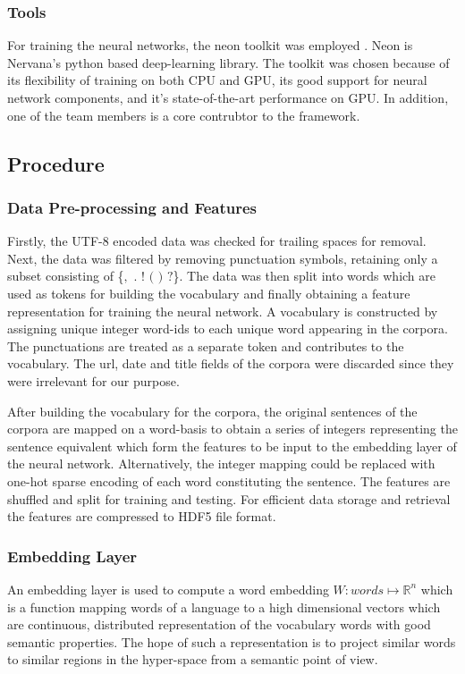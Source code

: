 \documentclass[12pt]{article}
\begin{document}
\subsubsection{Tools}
For training the neural networks, the neon toolkit was employed \cite{Neon}. Neon is Nervana's python based deep-learning library. The toolkit was chosen because of its flexibility of training on both CPU and GPU, its good support for neural network components, and it's state-of-the-art performance on GPU. In addition, one of the team members is a core contrubtor to the framework.

\subsection{Procedure}\label{procedure}

\subsubsection{Data Pre-processing and Features}

Firstly, the UTF-8 encoded data was checked for trailing spaces for removal. Next, the data was filtered by removing punctuation symbols, retaining only a subset consisting of \{$,$ $.$ $!$ $($ $)$ $?$\}. The data was then split into words which are used as tokens for building the vocabulary and finally obtaining a feature representation for training the neural network. A vocabulary is constructed by assigning unique integer word-ids to each unique word appearing in the corpora. The punctuations are treated as a separate token and contributes to the vocabulary. The url, date and title fields of the corpora were discarded since they were irrelevant for our purpose.  

After building the vocabulary for the corpora, the original sentences of the corpora are mapped on a word-basis to obtain a series of integers representing the sentence equivalent which form the features to be input to the embedding layer of the neural network. Alternatively, the integer mapping could be replaced with one-hot sparse encoding of each word constituting the sentence. The features are shuffled and split for training and testing. For efficient data storage and retrieval the features are compressed to HDF5 file format.

\subsubsection{Embedding Layer}
An embedding layer is used to compute a word embedding $W: words \mapsto \mathbb{R}^{n}$ which is a function mapping words of a language to a high dimensional vectors which are continuous, distributed representation of the vocabulary words with good semantic properties. The hope of such a representation is to project similar words to similar regions in the hyper-space from a semantic point of view. 
\end{document}
